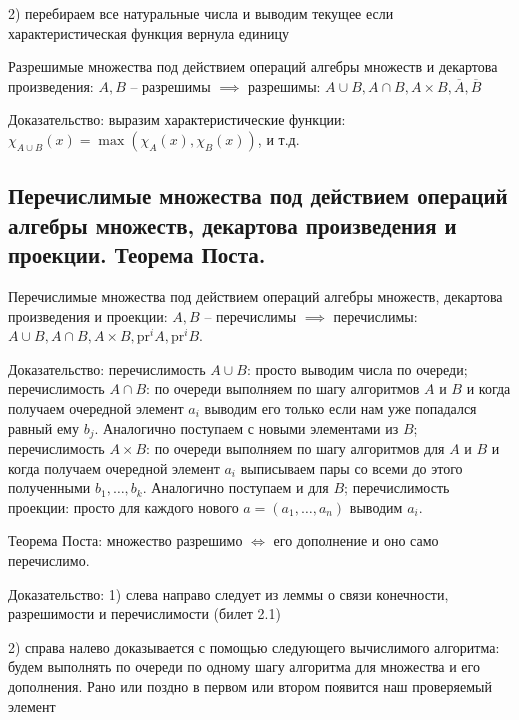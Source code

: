 \documentclass[a4paper, 10pt]{article}
\begin{document}
2) перебираем все натуральные числа и выводим текущее если характеристическая функция вернула единицу

\hfill

Разрешимые множества под действием операций алгебры множеств и декартова произведения: $A,B$ -- разрешимы $\implies$ разрешимы: $A\cup B, A\cap B, A\times B, \overline{A}, \overline{B}$

Доказательство: выразим характеристические функции: $\chi_{A\cup B}(x)=\max(\chi_A(x),\chi_B(x))$, и т.д.

\subsection{Перечислимые множества под действием операций алгебры множеств, декартова произведения и проекции. Теорема Поста.}

Перечислимые множества под действием операций алгебры множеств, декартова произведения и проекции: $A,B$ -- перечислимы $\implies$ перечислимы: $A\cup B, A\cap B, A\times B, \text{pr}^i A, \text{pr}^i B$.

Доказательство: перечислимость $A\cup B$: просто выводим числа по очереди; перечислимость $A\cap B$: по очереди выполняем по шагу алгоритмов $A$ и $B$ и когда получаем очередной элемент $a_i$ выводим его только если нам уже попадался равный ему $b_j$. Аналогично поступаем с новыми элементами из $B$; перечислимость $A\times B$: по очереди выполняем по шагу алгоритмов для $A$ и $B$ и когда получаем очередной элемент $a_i$ выписываем пары со всеми до этого полученными $b_1,\ldots,b_k$. Аналогично поступаем и для $B$; перечислимость проекции: просто для каждого нового $a=(a_1,\ldots,a_n)$ выводим $a_i$.

\hfill

Теорема Поста: множество разрешимо $\iff$ его дополнение и оно само перечислимо.

Доказательство: 1) слева направо следует из леммы о связи конечности, разрешимости и перечислимости (билет 2.1)

2) справа налево доказывается с помощью следующего вычислимого алгоритма: будем выполнять по очереди по одному шагу алгоритма для множества и его дополнения. Рано или поздно в первом или втором появится наш проверяемый элемент
\end{document}
